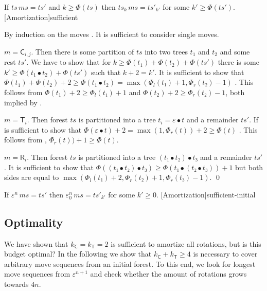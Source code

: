 \documentclass[svgnames,dvipsnames,table,review%
]{jfp-epi}
\makeatletter
\newenvironment{proof*}[1][\proofname]{\par
  \normalfont \topsep6\p@\@plus6\p@\relax
  \trivlist
  \item[\@proofindent\hskip\labelsep
        {\@proofnamefont #1\@addpunct{.}}]\ignorespaces
}{%
}
\newcommand{\tC}{\ensuremath{\mathsf{C}}}
\newcommand{\tR}{\ensuremath{\mathsf{R}}}
\newcommand{\tT}{\ensuremath{\mathsf{T}}}
\renewcommand{\Cat}[2]{\ensuremath{\tC_{#1,#2}}}
\newcommand{\Rot}[1]{\ensuremath{\tR_{#1}}}
\renewcommand{\Tail}[1]{\ensuremath{\tT_{#1}}}
\newcommand{\vms}{\ensuremath{\mathit{ms}}}
\newcommand{\vts}{\ensuremath{\mathit{ts}}}
\newcommand{\vtsp}{\ensuremath{\mathit{ts'}}}
\makeatother
\begin{document}
\begin{theorem}
  If $\vts \, \vms = \vtsp$ and $k \geq \Phi(\vts)$ then $\vts_k \, \vms = \vtsp_{k'}$ for some $k' \geq \Phi(\vtsp)$. [Amortization]{sufficient}
\end{theorem}
\begin{proof*}
  By induction on the moves .
  It is sufficient to consider single moves.
  \begin{caselist}

  \nextcase $m = \Cat i j$.
  Then there is some partition of $\vts$ into two trees $t_1$ and $t_2$ and some rest $\vtsp$.
  We have to show that for $k \geq \Phi(t_1) + \Phi(t_2) + \Phi(\vtsp)$
  there is some $k' \geq \Phi(t_1 ∙ t_2) + \Phi(\vtsp)$ such that $k + 2 = k'$.
  It is sufficient to show that $\Phi(t_1) + \Phi(t_2) + 2 \geq \Phi(t_1 ∙ t_2) = \max (\Phi_l(t₁)+1, \Phi_r(t₂)-1)$ .
  This follows from $\Phi(t_1) + 2 \geq \Phi_l(t₁) + 1$
  and $\Phi(t_2) + 2 \geq \Phi_r(t₂)-1$, both implied by 
  .

  \nextcase $m = \Tail i$.
  Then forest $\vts$ is partitioned into a tree $t_i = ε ∙ t$ and a remainder $\vtsp$.
  If is sufficient to show that $\Phi(ε ∙ t) + 2 = \max(1, \Phi_r(t)) + 2 \geq \Phi(t)$
  .
  This follows from  , $\Phi_r(t)) + 1 \geq \Phi(t)$.

  \nextcase $m = \Rot i$.
  Then forest $\vts$ is partitioned into a tree $(t₁ ∙ t₂) ∙ t₃$ and a remainder $\vtsp$.
  It is sufficient to show that
  $\Phi((t₁ ∙ t₂) ∙ t₃) \geq \Phi(t₁ ∙ (t₂ ∙ t₃)) + 1$
  but both sides are equal to $\max(\Phi_l(t₁)+2, \Phi_r(t₂)+1, \Phi_r(t₃)-1)$.
  \qed

  \end{caselist}
\end{proof*}
\begin{corollary}
  If $\varepsilon^n \, \vms = \vtsp$ then $\varepsilon^n_0 \, \vms = \vtsp_{k'}$ for some $k' \geq 0$.
  [Amortization]{sufficient-initial}
\end{corollary}


\subsection{Optimality}\label{sec:optimality}

We have shown that $k_\tC = k_\tT = 2$ is sufficient to amortize all rotations, but is this budget optimal?
In the following we show that $k_\tC + k_\tT \geq 4$ is necessary to cover arbitrary move sequences from an initial forest.
To this end, we look for longest move sequences from $\varepsilon^{n+1}$ and check whether the amount of rotations grows towards $4n$.
\end{document}
